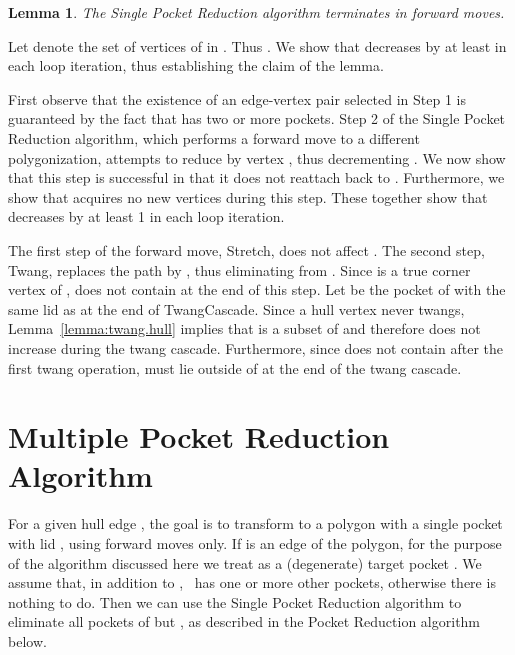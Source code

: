 \pdfoutput=1  \documentclass{article}
\def\st{{\sc Stretch}}
\def\tw{{\sc Twang}}
\def\twc{{\sc TwangCascade}}
\newtheorem{lemma}[theorem]{Lemma}
\newcommand{\lemlab}[1]{\label{lemma:#1}}
\newcommand{\seclab}[1]{\label{sec:#1}}
\newcommand{\lemref}[1]{\ref{lemma:#1}}
\newcommand{\ABox}{
\raisebox{3pt}{\framebox[6pt]{\rule{6pt}{0pt}}}
}
\newenvironment{pf}{{\bf Proof:}}{\hfill\ABox}
\begin{document}
\vspace{-0.8em}
\begin{lemma}
The {\sc Single Pocket Reduction} algorithm terminates in  forward moves.
\lemlab{single.pocket.reduction}
\end{lemma}
\begin{pf}
Let  denote the set of vertices of  in . Thus . We show that  decreases by at least  in each loop
iteration, thus establishing the claim of the lemma.

First observe that the existence of an edge-vertex pair 
  selected in Step 1 is guaranteed by the fact that  has two or
  more pockets.
Step 2 of the {\sc Single Pocket Reduction} algorithm, which performs
a forward move to a different polygonization,
attempts to reduce  by vertex , thus decrementing . We now show
that this step is successful in that it
does not reattach  back to . Furthermore, we show that
 acquires no new vertices during this step. These together
show that  decreases by at least 1 in each loop iteration.

The first step of the forward move, \st, does not affect .
The second step, \tw, replaces
the path  by , thus eliminating  from
. Since  is a true corner vertex of , 
does not contain  at the end of this step. Let  be the pocket of 
with the same lid as  at the end of \twc. Since a hull vertex never twangs,
Lemma~\lemref{twang.hull} implies that
 is a subset of  and therefore  does
not increase during the twang cascade. Furthermore, since
 does not contain  after the first twang operation,
 must lie outside of  at the end of the twang
cascade. \end{pf}



\vspace{-0.4em}
\section{Multiple Pocket Reduction Algorithm}
\seclab{multiple.pocket.reduction} For a given hull edge , the
goal is to transform  to a polygon with a single pocket with lid
, using forward moves only. If  is an edge of the polygon, for
the purpose of the algorithm discussed here we treat  as a
(degenerate) target pocket . We assume that, in addition to
,~ has one or more other pockets, otherwise there is nothing to do.
Then we can use the {\sc Single Pocket Reduction} algorithm to
eliminate all pockets of  but , as described in the {\sc
Pocket Reduction} algorithm below.
\end{document}
